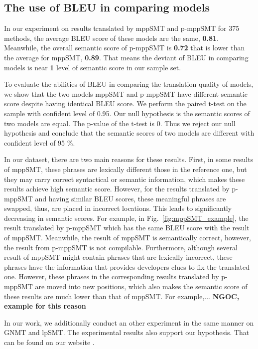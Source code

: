 \subsection{The use of BLEU in comparing models}
In our experiment on results translated by mppSMT and p-mppSMT for 375 methods, 
the average BLEU score of these models are the same, \textbf{0.81}. Meanwhile, 
the overall semantic score of p-mppSMT is \textbf{0.72} that is lower than the 
average for mppSMT, \textbf{0.89}. That means the deviant of BLEU in comparing 
models is near \textbf{1} level of semantic score in our sample set. 

To evaluate the abilities of BLEU in comparing the 
translation quality of models, we show that the two models mppSMT and p-mppSMT have different semantic score despite having identical BLEU score. We perform the paired t-test on the sample with confident level of 0.95. Our null hypothesis is the semantic scores of two models are equal. The p-value of the t-test is 0. Thus we reject our null hypothesis and conclude that the semantic scores of two models are different with confident level of 95 \%.


In our dataset, there are two main reasons for these results. First,
in some results of mppSMT, these phrases are lexically different those
in the reference one, but they may carry correct syntactical or
semantic information, which makes these results achieve high semantic
score. However, for the results translated by p-mppSMT and having
similar BLEU scores, these meaningful phrases are swapped, thus, are
placed in incorrect locations. This leads to significantly decreasing
in semantic scores. For example, in Fig.~\ref{fig:mppSMT_example}, the
result translated by p-mppSMT which has the same BLEU score with the
result of mppSMT. Meanwhile, the result of mppSMT is semantically
correct, however, the result from p-mppSMT is not compilable.
%
Furthermore, although several result of mppSMT might contain phrases
that are lexically incorrect, these phrases have the information that
provides developers clues to fix the translated one. However, these
phrases in the corresponding results translated by p-mppSMT are moved
into new positions, which also makes the semantic score of these
results are much lower than that of mppSMT. For example,...
\textbf{NGOC, example for this reason}

In our work, we additionally conduct an other experiment in the same
manner on GNMT and lpSMT.  The experimental results also support our
hypothesis. That can be found on our website \cite{??}.

